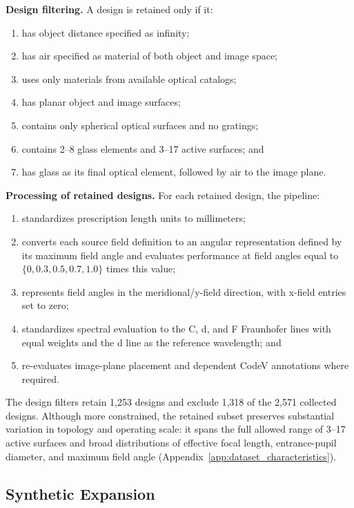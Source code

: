 \noindent\textbf{Design filtering.} A design is retained only if it:
\begin{enumerate}
    \item has object distance specified as infinity;
    \item has air specified as material of both object and image space;
    \item uses only materials from available optical catalogs;
    \item has planar object and image surfaces;
    \item contains only spherical optical surfaces and no gratings;
    \item contains 2--8 glass elements and 3--17 active surfaces; and
    \item has glass as its final optical element, followed by air to the image plane.
\end{enumerate}

\noindent\textbf{Processing of retained designs.} For each retained design, the pipeline:
\begin{enumerate}
    \item standardizes prescription length units to millimeters;
    \item converts each source field definition to an angular representation defined by its maximum field angle and evaluates performance at field angles equal to $\{0,0.3,0.5,0.7,1.0\}$ times this value;
    \item represents field angles in the meridional/y-field direction, with x-field entries set to zero;
    \item standardizes spectral evaluation to the C, d, and F Fraunhofer lines with equal weights and the d line as the reference wavelength; and
    \item re-evaluates image-plane placement and dependent CodeV annotations where required.
\end{enumerate}

The design filters retain 1,253 designs and exclude 1,318 of the 2,571 collected designs. Although more constrained, the retained subset preserves substantial variation in topology and operating scale: it spans the full allowed range of 3--17 active surfaces and broad distributions of effective focal length, entrance-pupil diameter, and maximum field angle (Appendix~\ref{app:dataset_characteristics}). 

\subsection{Synthetic Expansion}
\label{sec:dataset_synthetic_expansion}

